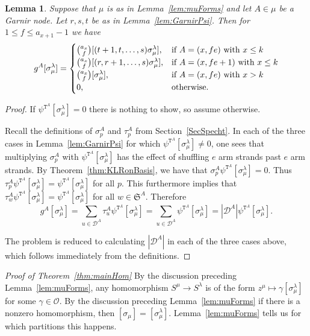 \documentclass[twoside,11pt,reqno,letter]{amsart}
\numberwithin{equation}{section}
\newtheorem{Lemma}[equation]{Lemma}
\theoremstyle{definition}  %
\newcommand{\0}{{\bar 0}}
\newcommand{\1}{{\bar 1}}
\newcommand{\ga}{\gamma}
\newcommand{\la}{\lambda}
\def\Si{\mathfrak{S}}
\newcommand{\si}{\sigma}
\newcommand{\D}{{\mathscr D}}
\def\T{{\mathtt T}}
\renewcommand\O{\mathcal O}
\begin{document}
{\begin{Lemma}\label{lem:GarnirRel}
  Suppose that $\mu$ is as in Lemma~\ref{lem:muForms} and let $A \in \mu$ be a Garnir node. Let $r, s, t$ be as in Lemma~\ref{lem:GarnirPsi}. Then for $1 \leq f \leq a_{x+1}-1$ we have
  \[
    g^A [\si^\la_\mu] = \begin{cases}
      \binom{a_x}{f} [(t+1, t, \dots, s) \si^\la_\mu],& \textup{if $A = (x, fe)$ with $x \leq k$} \\
      \binom{a_x}{f} [(r, r+1, \dots, s) \si^\la_\mu],& \textup{if $A = (x, fe + 1)$ with $x \leq k$}\\
      \binom{a_x}{f} [\si^\la_\mu],& \textup{if $A = (x, fe)$ with $x > k$}\\
      0,& \textup{otherwise}.
    \end{cases}
  \]
\end{Lemma}

\begin{proof}
  If $\psi^{\T^A} [\si^\la_\mu] = 0$ there is nothing to show, so assume otherwise.

  Recall the definitions of $\si^A_p$ and $\tau^A_p$ from Section~\ref{SecSpecht}. In each of the three cases in Lemma~\ref{lem:GarnirPsi} for which $\psi^{\T^A} [\si^\la_\mu] \neq 0$, one sees that multiplying $\si^A_p$ with $\psi^{\T^A} [\si^\la_\mu]$ has the effect of shuffling $e$ arm strands past $e$ arm strands. By Theorem~\ref{thm:KLRonBasis}, we have that $\si^A_p \psi^{\T^A} [\si^\la_\mu] = 0$. Thus $\tau^A_p \psi^{\T^A} [\si^\la_\mu] = \psi^{\T^A} [\si^\la_\mu]$ for all $p$. This furthermore implies that $\tau^A_w \psi^{\T^A} [\si^\la_\mu] = \psi^{\T^A} [\si^\la_\mu]$ for all $w \in \Si^A$. Therefore
\[
  g^A [\si^\la_\mu] = \sum_{u \in \D^A} \tau^A_u \psi^{\T^A} [\si^\la_\mu]
             = \sum_{u \in \D^A} \psi^{\T^A} [\si^\la_\mu]
             = \left| \D^A \right| \psi^{\T^A} [\si^\la_\mu].
\]

The problem is reduced to calculating $\left| \D^A \right|$ in each of the three cases above, which follows immediately from the definitions.
\end{proof}










\emph{Proof of Theorem~\ref{thm:mainHom}}
  By the discussion preceding Lemma~\ref{lem:muForms}, any homomorphism $S^\mu \to S^\la$ is of the form $z^\mu \mapsto \ga [\si^\la_\mu]$ for some $\ga \in \O$. By the discussion preceding Lemma~\ref{lem:muForms} if there is a nonzero homomorphism, then $[\si_{\mu}] = [\si^\la_\mu]$. Lemma~\ref{lem:muForms} tells us for which partitions this happens. 

}
\end{document}
